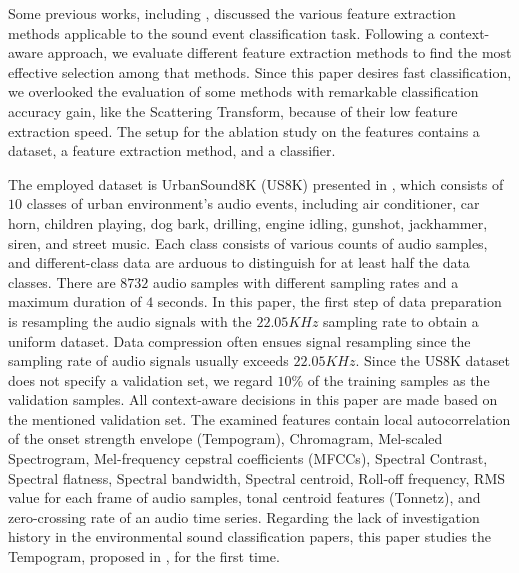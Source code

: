 \documentclass{article}
\begin{document}
Some previous works, including \citep{Song, Theodoros, Su, Li}, discussed the various feature extraction methods applicable to the sound event classification task. Following a context-aware approach, we evaluate different feature extraction methods to find the most effective selection among that methods. Since this paper desires fast classification, we overlooked the evaluation of some methods with remarkable classification accuracy gain, like the Scattering Transform, because of their low feature extraction speed. The setup for the ablation study on the features contains a dataset, a feature extraction method, and a classifier. 

The employed dataset is UrbanSound8K (US8K) presented in \citep{Salamon}, which consists of $10$ classes of urban environment's audio events, including air conditioner, car horn, children playing, dog bark, drilling, engine idling, gunshot, jackhammer, siren, and street music. Each class consists of various counts of audio samples, and different-class data are arduous to distinguish for at least half the data classes. There are $8732$ audio samples with different sampling rates and a maximum duration of $4$ seconds. In this paper, the first step of data preparation is resampling the audio signals with the $22.05KHz$ sampling rate to obtain a uniform dataset. Data compression often ensues signal resampling since the sampling rate of audio signals usually exceeds $22.05KHz$. Since the US8K dataset does not specify a validation set, we regard $10\%$ of the training samples as the validation samples. All context-aware decisions in this paper are made based on the mentioned validation set. The examined features contain local autocorrelation of the onset strength envelope (Tempogram), Chromagram, Mel-scaled Spectrogram, Mel-frequency cepstral coefficients (MFCCs), Spectral Contrast, Spectral flatness, Spectral bandwidth, Spectral centroid, Roll-off frequency, RMS value for each frame of audio samples, tonal centroid features (Tonnetz), and zero-crossing rate of an audio time series. Regarding the lack of investigation history in the environmental sound classification papers, this paper studies the Tempogram, proposed in \citep{Grosche}, for the first time. 
\end{document}

